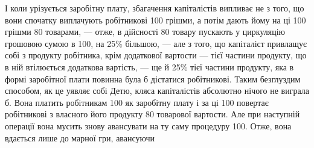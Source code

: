 І коли урізується заробітну плату, збагачення капіталістів випливає
не з того, що вони спочатку виплачують робітникові 100
грішми, а потім дають йому на ці 100 грішми 80
товарами, — отже, в дійсності 80 товару пускають у циркуляцію
грошовою сумою в 100, на 25\% більшою, — але з того, що капіталіст
привлащує собі з продукту робітника, крім додаткової вартости — тієї
частини продукту, що в ній втілюється додаткова вартість, — ще й
25\% тієї частини продукту, яка в формі заробітної плати повинна була
б дістатися робітникові. Таким безглуздим способом, як це уявляє собі Детю,
кляса капіталістів абсолютно нічого не виграла б. Вона платить робітникам
100 як заробітну плату і за ці 100 повертає робітникові
з власного його продукту 80 товарової вартости. Але
при наступній операції вона мусить знову авансувати на ту саму процедуру
100. Отже, вона вдається лише до марної гри, авансуючи
\parbreak{}  %
